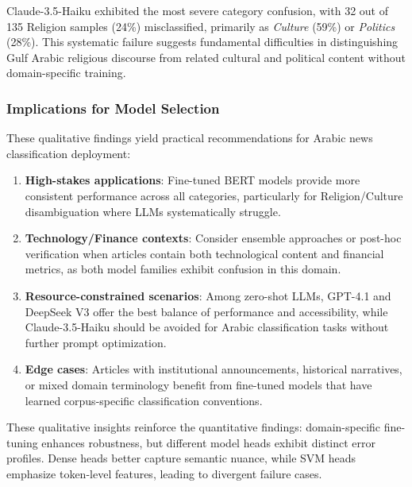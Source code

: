 \documentclass[sn-mathphys-num]{sn-jnl}
\begin{document}
Claude-3.5-Haiku exhibited the most severe category confusion, with 32 out of 135 Religion samples (24\%) misclassified, primarily as \textit{Culture} (59\%) or \textit{Politics} (28\%). This systematic failure suggests fundamental difficulties in distinguishing Gulf Arabic religious discourse from related cultural and political content without domain-specific training.

\subsubsection{Implications for Model Selection}

These qualitative findings yield practical recommendations for Arabic news classification deployment:

\begin{enumerate}
    \item \textbf{High-stakes applications}: Fine-tuned BERT models provide more consistent performance across all categories, particularly for Religion/Culture disambiguation where LLMs systematically struggle.
    
    \item \textbf{Technology/Finance contexts}: Consider ensemble approaches or post-hoc verification when articles contain both technological content and financial metrics, as both model families exhibit confusion in this domain.
    
    \item \textbf{Resource-constrained scenarios}: Among zero-shot LLMs, GPT-4.1 and DeepSeek V3 offer the best balance of performance and accessibility, while Claude-3.5-Haiku should be avoided for Arabic classification tasks without further prompt optimization.
    
    \item \textbf{Edge cases}: Articles with institutional announcements, historical narratives, or mixed domain terminology benefit from fine-tuned models that have learned corpus-specific classification conventions.
\end{enumerate}

These qualitative insights reinforce the quantitative findings: domain-specific fine-tuning enhances robustness, but different model heads exhibit distinct error profiles. Dense heads better capture semantic nuance, while SVM heads emphasize token-level features, leading to divergent failure cases.

\end{document}
